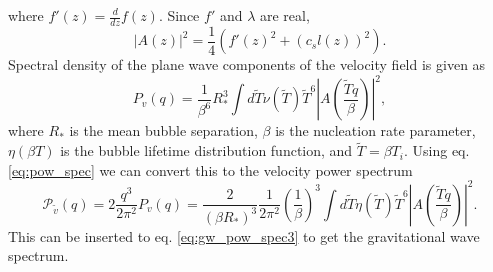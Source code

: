 where $f'(z) = \frac{d}{dz}f(z)$.
Since $f'$ and $\lambda$ are real,
\cite[eq. 4.11]{hindmarsh_gw_pt_2019}
\begin{equation}
|A(z)|^2 = \frac{1}{4} \left( f'(z)^2 + (c_s l(z))^2 \right).
\end{equation}
Spectral density of the plane wave components of the velocity field is given as
\cite[eq. 4.17]{hindmarsh_gw_pt_2019}
\begin{equation}
P_v(q) = \frac{1}{\beta^6}{R_*^3} \int d\tilde{T} \nu(\tilde{T}) \tilde{T}^6 |A(\frac{\tilde{T}q}{\beta})|^2,
\label{eq:spec_den_v}
\end{equation}
where $R_*$ is the mean bubble separation,
$\beta$ is the nucleation rate parameter,
$\eta(\beta T)$ is the bubble lifetime distribution function,
and $\tilde{T} = \beta T_i$.
Using eq. \eqref{eq:pow_spec} we can convert this to the velocity power spectrum
\cite[eq. 4.18]{hindmarsh_gw_pt_2019}
\begin{equation}
\mathcal{P}_{\tilde{v}}(q)
= 2 \frac{q^3}{2\pi^2} P_v(q)
= \frac{2}{(\beta R_*)^3} \frac{1}{2\pi^2} \left(\frac{1}{\beta}\right)^3
\int d \tilde{T} \eta(\tilde{T}) \tilde{T}^6 \left| A \left( \frac{\tilde{T} q}{\beta} \right) \right|^2.
\label{eq:pow_v}
\end{equation}
This can be inserted to eq. \ref{eq:gw_pow_spec3} to get the gravitational wave spectrum.


